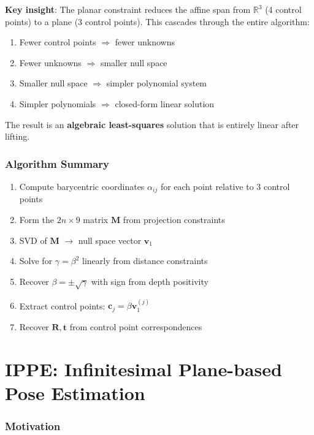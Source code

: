 \documentclass[11pt]{article}
\newcommand{\vect}[1]{\mathbf{#1}}
\newcommand{\mat}[1]{\mathbf{#1}}
\begin{document}
\begin{planarbox}
\textbf{Key insight}: The planar constraint reduces the affine span from $\mathbb{R}^3$ (4 control points) to a plane (3 control points). This cascades through the entire algorithm:
\begin{enumerate}
    \item Fewer control points $\Rightarrow$ fewer unknowns
    \item Fewer unknowns $\Rightarrow$ smaller null space
    \item Smaller null space $\Rightarrow$ simpler polynomial system
    \item Simpler polynomials $\Rightarrow$ closed-form linear solution
\end{enumerate}
The result is an \textbf{algebraic least-squares} solution that is entirely linear after lifting.
\end{planarbox}

\section{Algorithm Summary}

\begin{enumerate}
    \item Compute barycentric coordinates $\alpha_{ij}$ for each point relative to 3 control points
    \item Form the $2n \times 9$ matrix $\mat{M}$ from projection constraints
    \item SVD of $\mat{M}$ $\rightarrow$ null space vector $\vect{v}_1$
    \item Solve for $\gamma = \beta^2$ linearly from distance constraints
    \item Recover $\beta = \pm\sqrt{\gamma}$ with sign from depth positivity
    \item Extract control points: $\vect{c}_j = \beta \vect{v}_1^{(j)}$
    \item Recover $\mat{R}, \vect{t}$ from control point correspondences
\end{enumerate}

\newpage
\part*{IPPE: Infinitesimal Plane-based Pose Estimation}

\section{Motivation}
\end{document}
